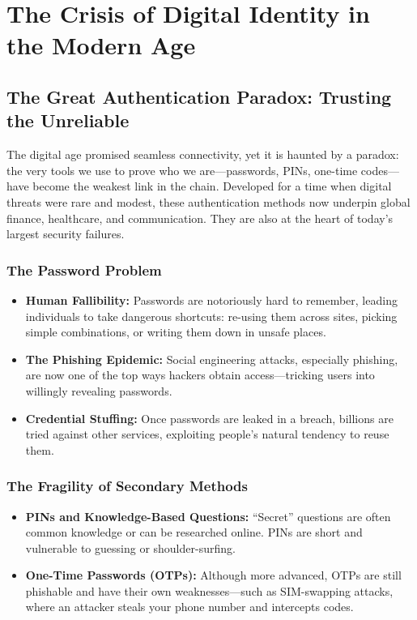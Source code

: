 \chapter{The Crisis of Digital Identity in the Modern Age}

\section{The Great Authentication Paradox: Trusting the Unreliable}
The digital age promised seamless connectivity, yet it is haunted by a paradox: the very tools we use to prove who we are—passwords, PINs, one-time codes—have become the weakest link in the chain. Developed for a time when digital threats were rare and modest, these authentication methods now underpin global finance, healthcare, and communication. They are also at the heart of today's largest security failures.

\subsection*{The Password Problem}
\begin{itemize}
    \item \textbf{Human Fallibility:} Passwords are notoriously hard to remember, leading individuals to take dangerous shortcuts: re-using them across sites, picking simple combinations, or writing them down in unsafe places.
    \item \textbf{The Phishing Epidemic:} Social engineering attacks, especially phishing, are now one of the top ways hackers obtain access—tricking users into willingly revealing passwords.
    \item \textbf{Credential Stuffing:} Once passwords are leaked in a breach, billions are tried against other services, exploiting people’s natural tendency to reuse them.
\end{itemize}

\subsection*{The Fragility of Secondary Methods}
\begin{itemize}
    \item \textbf{PINs and Knowledge-Based Questions:} “Secret” questions are often common knowledge or can be researched online. PINs are short and vulnerable to guessing or shoulder-surfing.
    \item \textbf{One-Time Passwords (OTPs):} Although more advanced, OTPs are still phishable and have their own weaknesses—such as SIM-swapping attacks, where an attacker steals your phone number and intercepts codes.
\end{itemize}

